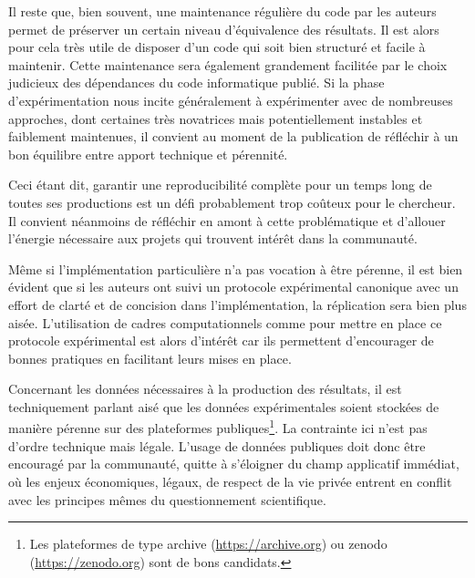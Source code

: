 Il reste que, bien souvent, une maintenance régulière du code par les auteurs permet de préserver un certain niveau d'équivalence des résultats. Il est alors pour cela très utile de disposer d'un code qui soit bien structuré et facile à maintenir. Cette maintenance sera également grandement facilitée par le choix judicieux des dépendances du code informatique publié. Si la phase d'expérimentation nous incite généralement à expérimenter avec de nombreuses approches, dont certaines très novatrices mais potentiellement instables et faiblement maintenues, il convient au moment de la publication de réfléchir à un bon équilibre entre apport technique et pérennité.

Ceci étant dit, garantir une reproducibilité complète pour un temps long de toutes ses productions est un défi probablement trop coûteux pour le chercheur. Il convient néanmoins de réfléchir en amont à cette problématique et d'allouer l'énergie nécessaire aux projets qui trouvent intérêt dans la communauté.

Même si l'implémentation particulière n'a pas vocation à être pérenne, il est bien évident que si les auteurs ont suivi un protocole expérimental canonique avec un effort de clarté et de concision dans l'implémentation, la réplication sera bien plus aisée. L'utilisation de cadres computationnels comme \explanes pour mettre en place ce protocole expérimental est alors d'intérêt car ils permettent d'encourager de bonnes pratiques en facilitant leurs mises en place.

Concernant les données nécessaires à la production des résultats, il est techniquement parlant aisé que les données expérimentales soient stockées de manière pérenne sur des plateformes publiques\footnote{Les plateformes de type \textsf
{archive} (\url{https://archive.org}) ou \textsf
{zenodo} (\url{https://zenodo.org}) sont de bons candidats.}. La contrainte ici n'est pas d'ordre technique mais légale. L'usage de données publiques doit donc être encouragé par la communauté, quitte à s'éloigner du champ applicatif immédiat, où les enjeux économiques, légaux, de respect de la vie privée entrent en conflit avec les principes mêmes du questionnement scientifique.

